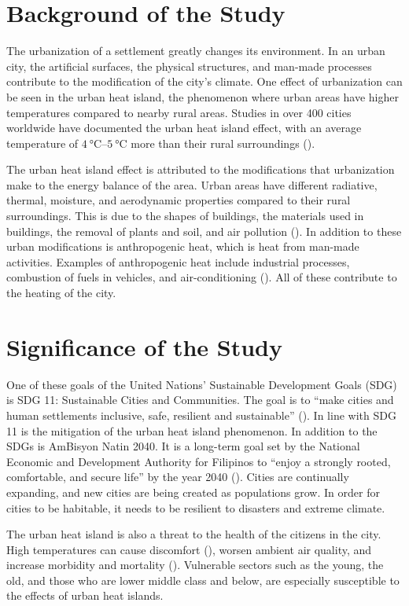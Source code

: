 \section{Background of the Study}
	The urbanization of a settlement greatly changes its environment.
	In an urban city, the artificial surfaces, the physical structures, and man-made processes contribute to the modification of the city's climate.
	One effect of urbanization can be seen in the urban heat island, the phenomenon where urban areas have higher temperatures compared to nearby rural areas.
	Studies in over 400 cities worldwide have documented the urban heat island effect,
		with an average temperature of $\qtyrange{4}{5}{\degreeCelsius}$ more than their rural surroundings (\cite{Santamouris2020}).
	
	The urban heat island effect is attributed to the modifications that urbanization make to the energy balance of the area.
	Urban areas have different radiative, thermal, moisture, and aerodynamic properties compared to their rural surroundings.
	This is due to the shapes of buildings, the materials used in buildings, the removal of plants and soil, and air pollution (\cite{Stewart2012}).
	In addition to these urban modifications is anthropogenic heat, which is heat from man-made activities.
	Examples of anthropogenic heat include industrial processes, combustion of fuels in vehicles, and air-conditioning (\cite{Oke2017urban}).
	All of these contribute to the heating of the city.
	
\section{Significance of the Study}
	One of these goals of the United Nations' Sustainable Development Goals (SDG) is SDG 11: Sustainable Cities and Communities.
	The goal is to ``make cities and human settlements inclusive, safe, resilient and sustainable'' (\cite{UN2015}).
	In line with SDG 11 is the mitigation of the urban heat island phenomenon.
	In addition to the SDGs is AmBisyon Natin 2040.
	It is a long-term goal set by the National Economic and Development Authority for Filipinos to ``enjoy a strongly rooted, comfortable, and secure life'' by the year 2040 (\cite{NEDA2016}).
	Cities are continually expanding, and new cities are being created as populations grow.
	In order for cities to be habitable, it needs to be resilient to disasters and extreme climate.	

	The urban heat island is also a threat to the health of the citizens in the city.
	High temperatures can cause discomfort (\cite{Bhati2018}), worsen ambient air quality, and increase morbidity and mortality (\cite {Khan2021}).
	Vulnerable sectors such as the young, the old, and those who are lower middle class and below,
		are especially susceptible to the effects of urban heat islands.
	
